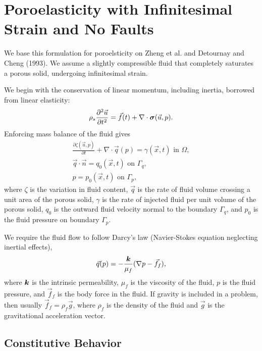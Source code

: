 \section{Poroelasticity with Infinitesimal Strain and No Faults}

We base this formulation for poroelsticity on Zheng et al. and
Detournay and Cheng (1993). We assume a slightly compressible fluid
that completely saturates a porous solid, undergoing infinitesimal
strain.

We begin with the conservation of linear momentum, including inertia,
borrowed from linear elasticity:
\begin{equation}
  \rho_s\frac{\partial^2 \vec{u}}{\partial t^2} = \vec{f}(t) + \nabla \cdot \bm{\sigma}(\vec{u},p).
\end{equation}
Enforcing mass balance of the fluid gives
\begin{gather}
  \frac{\partial \zeta(\vec{u},p)}{\partial t} + \nabla \cdot \vec{q}(p) =
  \gamma(\vec{x},t) \text{ in } \Omega, \\
  \vec{q} \cdot \vec{n} = q_0(\vec{x},t) \text{ on }\Gamma_q, \\
  p = p_0(\vec{x},t) \text{ on }\Gamma_p,
\end{gather}
where $\zeta$ is the variation in fluid content, $\vec{q}$ is the rate
of fluid volume crossing a unit area of the porous solid, $\gamma$ is
the rate of injected fluid per unit volume of the porous solid, $q_0$
is the outward fluid velocity normal to the boundary $\Gamma_q$, and
$p_0$ is the fluid pressure on boundary $\Gamma_p$.

We require the fluid flow to follow Darcy's law (Navier-Stokes
equation neglecting inertial effects),
\begin{equation}
  \vec{q}(p) = -\frac{\bm{k}}{\mu_{f}}(\nabla p - \vec{f}_f),
\end{equation}
where $\bm{k}$ is the intrinsic permeability, $\mu_f$ is the viscosity of the
fluid, $p$ is the fluid pressure, and $\vec{f}_f$ is the body force
in the fluid. If gravity is included in a problem, then usually
$\vec{f}_f = \rho_f \vec{g}$, where $\rho_f$ is the density of the
fluid and $\vec{g}$ is the gravitational acceleration vector.

\subsection{Constitutive Behavior}

